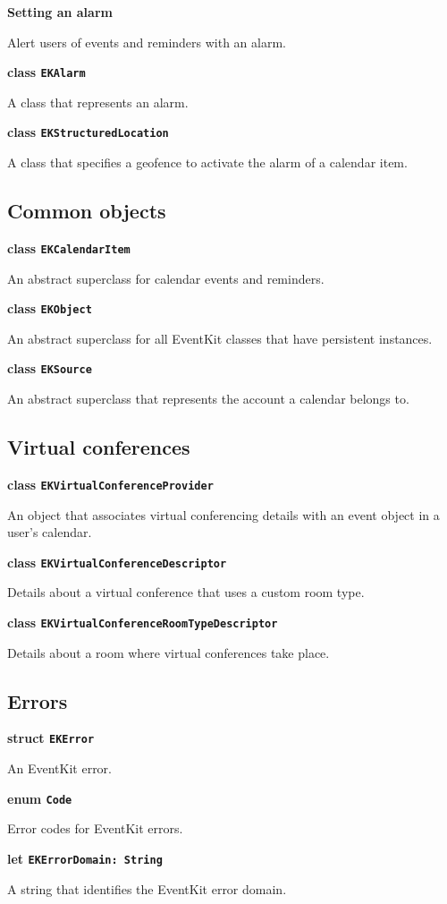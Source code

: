 \documentclass{article}
\begin{document}
\textbf{Setting an alarm}

Alert users of events and reminders with an alarm.

\textbf{class \texttt{EKAlarm}}

A class that represents an alarm.

\textbf{class \texttt{EKStructuredLocation}}

A class that specifies a geofence to activate the alarm of a calendar item.

\subsection*{Common objects}

\textbf{class \texttt{EKCalendarItem}}

An abstract superclass for calendar events and reminders.

\textbf{class \texttt{EKObject}}

An abstract superclass for all EventKit classes that have persistent instances.

\textbf{class \texttt{EKSource}}

An abstract superclass that represents the account a calendar belongs to.

\subsection*{Virtual conferences}

\textbf{class \texttt{EKVirtualConferenceProvider}}

An object that associates virtual conferencing details with an event object in a user's calendar.

\textbf{class \texttt{EKVirtualConferenceDescriptor}}

Details about a virtual conference that uses a custom room type.

\textbf{class \texttt{EKVirtualConferenceRoomTypeDescriptor}}

Details about a room where virtual conferences take place.

\subsection*{Errors}

\textbf{struct \texttt{EKError}}

An EventKit error.

\textbf{enum \texttt{Code}}

Error codes for EventKit errors.

\textbf{let \texttt{EKErrorDomain: String}}

A string that identifies the EventKit error domain.
\newpage
\end{document}
